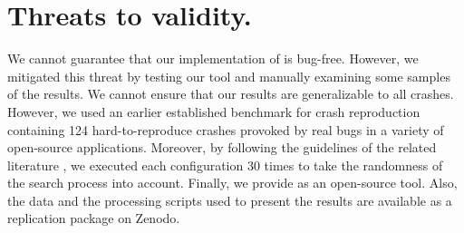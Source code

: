 \section{Threats to validity.}
We cannot guarantee that our implementation of \botsing is bug-free. However, we mitigated this threat by testing our tool and manually examining some samples of the results. 
We cannot ensure that our results are generalizable to all crashes. However, we used an earlier established benchmark for crash reproduction containing 124 hard-to-reproduce crashes provoked by real bugs in a variety of open-source applications. 
Moreover, by following the guidelines of the related literature \cite{Arcuri2014}, we executed each configuration 30 times to take the randomness of the search process into account.
Finally, we provide \botsing as an open-source tool. Also, the data and the processing scripts used to present the results are available as a replication package on Zenodo\cite{derakhshanfar_pouria_2020_3953519}.
